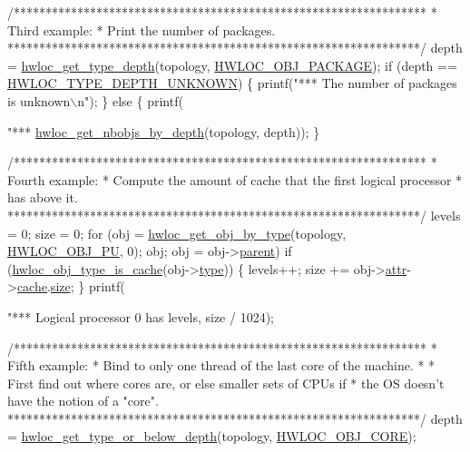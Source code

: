 \begin{DoxyCodeInclude}
{{{{{    \textcolor{comment}{/*****************************************************************}
\textcolor{comment}{     * Third example:}
\textcolor{comment}{     * Print the number of packages.}
\textcolor{comment}{     *****************************************************************/}
    depth = \hyperlink{a00187_ga8bec782e21be313750da70cf7428b374}{hwloc\_get\_type\_depth}(topology, \hyperlink{a00184_ggacd37bb612667dc437d66bfb175a8dc55ab16ab8c0dbffc234921d86f3dfb63129}{HWLOC\_OBJ\_PACKAGE});
    \textcolor{keywordflow}{if} (depth == \hyperlink{a00187_ggaf4e663cf42bbe20756b849c6293ef575a0565ab92ab72cb0cec91e23003294aad}{HWLOC\_TYPE\_DEPTH\_UNKNOWN}) \{
        printf(\textcolor{stringliteral}{"*** The number of packages is unknown\(\backslash\)n"});
    \} \textcolor{keywordflow}{else} \{
        printf(\textcolor{stringliteral}{"*** %
               \hyperlink{a00187_ga1d5ceafe8130fe6e8657bf0bc666ba50}{hwloc\_get\_nbobjs\_by\_depth}(topology, depth));
    \}

    \textcolor{comment}{/*****************************************************************}
\textcolor{comment}{     * Fourth example:}
\textcolor{comment}{     * Compute the amount of cache that the first logical processor}
\textcolor{comment}{     * has above it.}
\textcolor{comment}{     *****************************************************************/}
    levels = 0;
    size = 0;
    \textcolor{keywordflow}{for} (obj = \hyperlink{a00187_ga6f414dd80a2b943967a0ac92da3181a2}{hwloc\_get\_obj\_by\_type}(topology, \hyperlink{a00184_ggacd37bb612667dc437d66bfb175a8dc55abca6887e80cb291353b0a0c1da83f661}{HWLOC\_OBJ\_PU}, 0);
         obj;
         obj = obj->\hyperlink{a00238_adc494f6aed939992be1c55cca5822900}{parent})
      \textcolor{keywordflow}{if} (\hyperlink{a00198_ga2ed589bea28711e80b92066510a5607d}{hwloc\_obj\_type\_is\_cache}(obj->\hyperlink{a00238_acc4f0803f244867e68fe0036800be5de}{type})) \{
        levels++;
        size += obj->\hyperlink{a00238_accd40e29f71f19e88db62ea3df02adc8}{attr}->\hyperlink{a00242_ab5a8ae3bf490e6b1071fea53f7382836}{cache}.\hyperlink{a00254_abe5e788943ed04302976740c829674c0}{size};
      \}
    printf(\textcolor{stringliteral}{"*** Logical processor 0 has %
           levels, size / 1024);

    \textcolor{comment}{/*****************************************************************}
\textcolor{comment}{     * Fifth example:}
\textcolor{comment}{     * Bind to only one thread of the last core of the machine.}
\textcolor{comment}{     *}
\textcolor{comment}{     * First find out where cores are, or else smaller sets of CPUs if}
\textcolor{comment}{     * the OS doesn't have the notion of a "core".}
\textcolor{comment}{     *****************************************************************/}
    depth = \hyperlink{a00187_ga8125328e69eba709c33ea8055c12589b}{hwloc\_get\_type\_or\_below\_depth}(topology, 
      \hyperlink{a00184_ggacd37bb612667dc437d66bfb175a8dc55ac793958f330bca371aa1535de8aff45f}{HWLOC\_OBJ\_CORE});

}}}}}}}
\end{DoxyCodeInclude}
